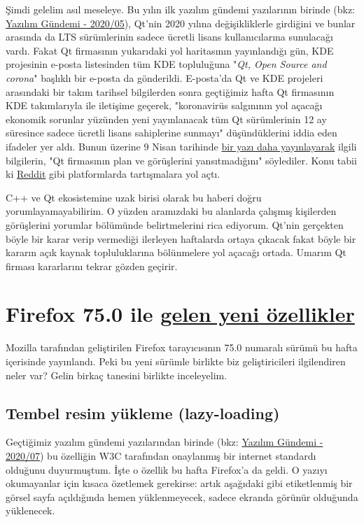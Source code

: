 \documentclass[11pt]{article}
\begin{document}
Şimdi gelelim asıl meseleye. Bu yılın ilk yazılım gündemi yazılarının birinde
(bkz: \href{../05/yazilim-gundemi-2020-05.pdf}{Yazılım Gündemi - 2020/05}), Qt'nin 2020 yılına değişikliklerle girdiğini
ve bunlar arasında da LTS sürümlerinin sadece ücretli lisans kullanıcılarına
sunulacağı vardı. Fakat Qt firmasının yukarıdaki yol haritasının yayınlandığı
gün, KDE projesinin e-posta listesinden tüm KDE topluluğuna "\emph{Qt, Open Source
and corona}" başlıklı bir e-posta da gönderildi. E-posta'da Qt ve KDE
projeleri arasındaki bir takım tarihsel bilgilerden sonra geçtiğimiz hafta Qt
firmasının KDE takımlarıyla ile iletişime geçerek, "koronavirüs salgınının yol
açacağı ekonomik sorunlar yüzünden yeni yayınlanacak tüm Qt sürümlerinin 12 ay
süresince sadece ücretli lisans sahiplerine sunmayı" düşündüklerini iddia eden
ifadeler yer aldı. Bunun üzerine 9 Nisan tarihinde \href{https://www.qt.io/blog/qt-and-open-source}{bir yazı daha yayınlayarak}
ilgili bilgilerin, "Qt firmasının plan ve görüşlerini yansıtmadığını"
söylediler. Konu tabii ki \href{https://www.reddit.com/r/cpp/comments/fxbo24/qt\_open\_source\_and\_corona/}{Reddit} gibi platformlarda tartışmalara yol açtı.

C++ ve Qt ekosistemine uzak birisi olarak bu haberi doğru
yorumlayamayabilirim. O yüzden aramızdaki bu alanlarda çalışmış kişilerden
görüşlerini yorumlar bölümünde belirtmelerini rica ediyorum. Qt'nin gerçekten
böyle bir karar verip vermediği ilerleyen haftalarda ortaya çıkacak fakat
böyle bir kararın açık kaynak topluluklarına bölünmelere yol açacağı ortada.
Umarım Qt firması kararlarını tekrar gözden geçirir.
\section{Firefox 75.0 ile \href{https://hacks.mozilla.org/2020/04/firefox-75-ambitions-for-april/}{gelen yeni özellikler}}
\label{sec:orgddc0d88}
Mozilla tarafından geliştirilen Firefox tarayıcısının 75.0 numaralı sürümü bu
hafta içerisinde yayınlandı. Peki bu yeni sürümle birlikte biz geliştiricileri
ilgilendiren neler var? Gelin birkaç tanesini birlikte inceleyelim.

\subsection{Tembel resim yükleme (lazy-loading)}
\label{sec:orge3d96fa}
Geçtiğimiz yazılım gündemi yazılarından birinde (bkz: \href{../07/yazilim-gundemi-2020-07.pdf}{Yazılım Gündemi -
2020/07}) bu özelliğin W3C tarafından onaylanmış bir internet standardı
olduğunu duyurmuştum. İşte o özellik bu hafta Firefox'a da geldi. O yazıyı
okumayanlar için kısaca özetlemek gerekirse: artık aşağıdaki gibi etiketlenmiş
bir görsel sayfa açıldığında hemen yüklenmeyecek, sadece ekranda görünür
olduğunda yüklenecek.
\end{document}
